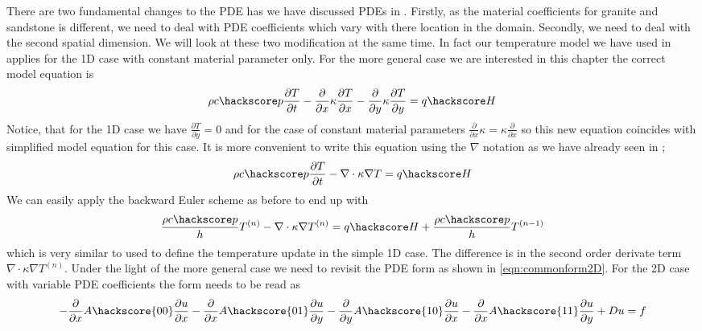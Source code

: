 There are two fundamental changes to the PDE has we have discussed PDEs in . Firstly,
as the material coefficients for granite and sandstone is different, we need to deal with 
PDE coefficients which vary with there location in the domain. Secondly, we need 
to deal with the second spatial dimension. We will look at these two modification at the same time. 
In fact our temperature model  we have used in  applies for the 
1D case with constant material parameter only. For the more general case we are interested 
in this chapter the correct model equation is 
\begin{equation}
\rho c\hackscore p \frac{\partial T}{\partial t} -  \frac{\partial }{\partial x} \kappa \frac{\partial T}{\partial x} -  \frac{\partial }{\partial y} \kappa \frac{\partial T}{\partial y} = q\hackscore H 
\label{eqn:hd2}
\end{equation}
Notice, that for the 1D case we have $\frac{\partial T}{\partial y}=0$ and
for the case of constant material parameters $\frac{\partial }{\partial x} \kappa = \kappa  \frac{\partial }{\partial x}$ so this new equation coincides with simplified model equation for this case. It is more convenient 
to write this equation using the $\nabla$ notation as we have already seen in ;
\begin{equation}\label{eqn:Tform nabla}
\rho c\hackscore p \frac{\partial T}{\partial t} 
-\nabla \cdot \kappa \nabla T = q\hackscore H
\end{equation}
We can easily apply the backward Euler scheme as before to end up with 
\begin{equation}
\frac{\rho c\hackscore p}{h} T^{(n)} -\nabla \cdot \kappa \nabla T^{(n)}  = q\hackscore H +  \frac{\rho c\hackscore p}{h} T^{(n-1)}
\label{eqn:hdgenf2}
\end{equation}
which is very similar to  used to define the temperature update in the simple 1D case. 
The difference is in the second order derivate term $\nabla \cdot \kappa \nabla T^{(n)}$. Under 
the light of the more general case we need to revisit the \esc PDE form as 
shown in \ref{eqn:commonform2D}. For the 2D case with variable PDE coefficients 
the form needs to be read as 
\begin{equation}\label{eqn:commonform2D 2}
-\frac{\partial }{\partial x} A\hackscore{00}\frac{\partial u}{\partial x} 
-\frac{\partial }{\partial x} A\hackscore{01}\frac{\partial u}{\partial y} 
-\frac{\partial }{\partial y} A\hackscore{10}\frac{\partial u}{\partial x} 
-\frac{\partial }{\partial x} A\hackscore{11}\frac{\partial u}{\partial y} 
+ Du = f
\end{equation}
